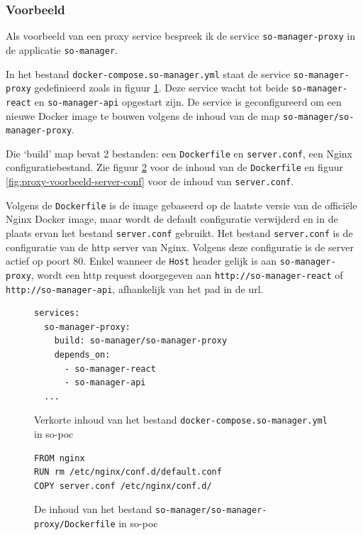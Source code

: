 \documentclass[a4paper,12pt]{report}
\begin{document}
\subsubsection{Voorbeeld}
Als voorbeeld van een proxy service bespreek ik de service \lstinline|so-manager-proxy| in de applicatie \lstinline|so-manager|.

In het bestand \lstinline|docker-compose.so-manager.yml| staat de service \lstinline|so-manager-proxy| gedefinieerd zoals in figuur \ref{fig:proxy-voorbeeld-compose}.
Deze service wacht tot beide \lstinline|so-manager-react| en \lstinline|so-manager-api| opgestart zijn.
De service is geconfigureerd om een nieuwe Docker image te bouwen volgens de inhoud van de map \lstinline|so-manager/so-manager-proxy|.

Die `build' map bevat 2 bestanden: een \lstinline|Dockerfile| en \lstinline|server.conf|, een Nginx configuratiebestand.
Zie figuur \ref{fig:proxy-voorbeeld-dockerfile} voor de inhoud van de \lstinline|Dockerfile| en figuur \ref{fig:proxy-voorbeeld-server-conf} voor de inhoud van \lstinline|server.conf|.

Volgens de \lstinline|Dockerfile| is de image gebaseerd op de laatste versie van de officiële Nginx Docker image, maar wordt de default configuratie verwijderd en in de plaats ervan het bestand \lstinline|server.conf| gebruikt.
Het bestand \lstinline|server.conf| is de configuratie van de http server van Nginx.
Volgens deze configuratie is de server actief op poort 80.
Enkel wanneer de \lstinline|Host| header gelijk is aan \lstinline|so-manager-proxy|, wordt een http request doorgegeven aan \lstinline|http://so-manager-react| of \lstinline|http://so-manager-api|, afhankelijk van het pad in de url.

\begin{figure}[H]
  \begin{lstlisting}
services:
  so-manager-proxy:
    build: so-manager/so-manager-proxy
    depends_on:
      - so-manager-react
      - so-manager-api
  ...
  \end{lstlisting}
  \caption{Verkorte inhoud van het bestand \lstinline|docker-compose.so-manager.yml| in so-poc}
  \label{fig:proxy-voorbeeld-compose}
\end{figure}

\begin{figure}[H]
  \begin{lstlisting}
FROM nginx
RUN rm /etc/nginx/conf.d/default.conf
COPY server.conf /etc/nginx/conf.d/
  \end{lstlisting}
  \caption{De inhoud van het bestand \lstinline|so-manager/so-manager-proxy/Dockerfile| in so-poc}
  \label{fig:proxy-voorbeeld-dockerfile}
\end{figure}
\end{document}
